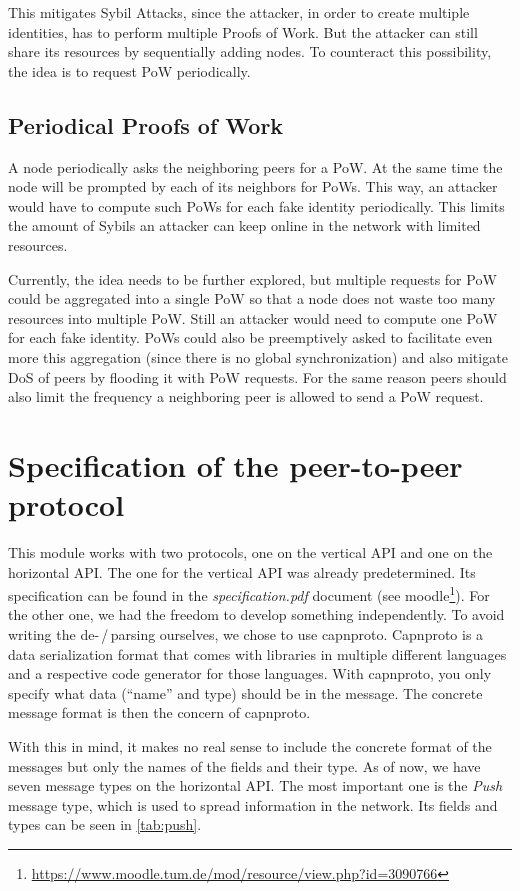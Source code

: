 \documentclass[a4paper,english,10pt,NET]{tumarticle}
\begin{document}
This mitigates Sybil Attacks, since the attacker, in order to create multiple identities, has to perform multiple Proofs of Work. But the attacker can still share its resources by sequentially adding nodes. To counteract this possibility, the idea is to request PoW periodically. 

\subsection{Periodical Proofs of Work}

A node periodically asks the neighboring peers for a PoW. At the same time the node will be prompted by each of its neighbors for PoWs. This way, an attacker would have to compute such PoWs for each fake identity periodically. This limits the amount of Sybils an attacker can keep online in the network with limited resources.

Currently, the idea needs to be further explored, but multiple requests for PoW could be aggregated into a single PoW so that a node does not waste too many resources into multiple PoW. Still an attacker would need to compute one PoW for each fake identity. PoWs could also be preemptively asked to facilitate even more this aggregation (since there is no global synchronization) and also mitigate DoS of peers by flooding it with PoW requests. For the same reason peers should also limit the frequency a neighboring peer is allowed to send a PoW request.


\section{Specification of the peer-to-peer protocol} \label{sec:msgtypes}
This module works with two protocols, one on the vertical API and one on the horizontal API.
The one for the vertical API was already predetermined.
Its specification can be found in the \emph{specification.pdf} document (see moodle\footnote{\url{https://www.moodle.tum.de/mod/resource/view.php?id=3090766}}).
For the other one, we had the freedom to develop something independently.
To avoid writing the de-\,/\,parsing ourselves, we chose to use capnproto.
Capnproto is a data serialization format that comes with libraries in multiple different languages and a respective code generator for those languages.
With capnproto, you only specify what data (\enquote{name} and type) should be in the message.
The concrete message format is then the concern of capnproto.

With this in mind, it makes no real sense to include the concrete format of the messages but only the names of the fields and their type.
As of now, we have seven message types on the horizontal API.
The most important one is the \emph{Push} message type, which is used to spread information in the network.
Its fields and types can be seen in \cref{tab:push}.
\end{document}
